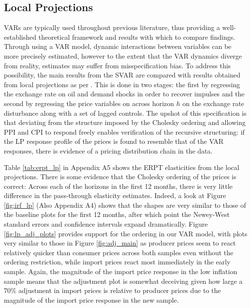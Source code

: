 \documentclass[12pt]{article}
\begin{document}
\subsection{Local Projections} 

VARs are typically used throughout previous literature, thus providing a well-established theoretical framework and results with which to compare findings. Through using a VAR model, dynamic interactions between variables can be more precisely estimated, however to the extent that the VAR dynamics diverge from reality, estimates may suffer from misspecification bias. To address this possibility, the main results from the SVAR are compared with results obtained from local projections as per \textcite{Jorda2005}. This is done in two stages: the first by regressing the exchange rate on oil and demand shocks in order to recover impulses and the second by regressing the price variables on  across horizon $h$ on the exchange rate disturbance along with a set of lagged controls. The upshot of this specification is that deviating from the structure imposed by the Cholesky ordering and allowing PPI and CPI to respond freely enables verification of the recursive structuring: if the LP response profile of the prices is found to resemble that of the VAR responses, there is evidence of a pricing distribution chain in the data. 

Table \ref{tab:erpt_lp} in Appendix A5 shows the ERPT elasticities from the local projections. There is some evidence that the Cholesky ordering of the prices is correct: Across each of the horizons in the first 12 months, there is very little difference in the pass-through elasticity estimates. Indeed, a look at Figure \ref{fig:irf_lp} (Also Appendix A4) shows that the shapes are very similar to those of the baseline plots for the first 12 months, after which point the Newey-West standard errors and confidence intervals expand dramatically. Figure \ref{fig:lp_adj_plots} provides support for the ordering in our VAR model, with plots very similar to those in Figure \ref{fig:adj_main} as producer prices seem to react relatively quicker than consumer prices across both samples even without the ordering restriction, while import prices react most immediately in the early sample. Again, the magnitude of the import price response in the low inflation sample means that the adjustment plot is somewhat deceiving given how large a 70\% adjustment in import prices is relative to producer prices due to the magnitude of the import price response in the new sample. 
\end{document}
